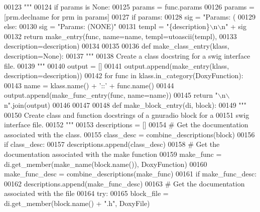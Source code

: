 \begin{DoxyCode}
{00123 \textcolor{stringliteral}{    """}
00124     \textcolor{keywordflow}{if} params \textcolor{keywordflow}{is} \textcolor{keywordtype}{None}:
00125         params = func.params
00126     params = [prm.declname \textcolor{keywordflow}{for} prm \textcolor{keywordflow}{in} params]
00127     \textcolor{keywordflow}{if} params:
00128         sig = \textcolor{stringliteral}{"Params: (%
00129     \textcolor{keywordflow}{else}:
00130         sig = \textcolor{stringliteral}{"Params: (NONE)"}
00131     templ = \textcolor{stringliteral}{"\{description\}\(\backslash\)n\(\backslash\)n"} + sig
00132     \textcolor{keywordflow}{return} make_entry(func, name=name, templ=utoascii(templ),
00133                       description=description)
00134 
00135 
00136 \textcolor{keyword}{def }make_class_entry(klass, description=None):
00137     \textcolor{stringliteral}{"""}
00138 \textcolor{stringliteral}{    Create a class docstring for a swig interface file.}
00139 \textcolor{stringliteral}{    """}
00140     output = []
00141     output.append(make_entry(klass, description=description))
00142     \textcolor{keywordflow}{for} func \textcolor{keywordflow}{in} klass.in\_category(DoxyFunction):
00143         name = klass.name() + \textcolor{stringliteral}{'::'} + func.name()
00144         output.append(make_func_entry(func, name=name))
00145     \textcolor{keywordflow}{return} \textcolor{stringliteral}{"\(\backslash\)n\(\backslash\)n"}.join(output)
00146 
00147 
00148 \textcolor{keyword}{def }make_block_entry(di, block):
00149     \textcolor{stringliteral}{"""}
00150 \textcolor{stringliteral}{    Create class and function docstrings of a gnuradio block for a}
00151 \textcolor{stringliteral}{    swig interface file.}
00152 \textcolor{stringliteral}{    """}
00153     descriptions = []
00154     \textcolor{comment}{# Get the documentation associated with the class.}
00155     class\_desc = combine_descriptions(block)
00156     \textcolor{keywordflow}{if} class\_desc:
00157         descriptions.append(class\_desc)
00158     \textcolor{comment}{# Get the documentation associated with the make function}
00159     make\_func = di.get\_member(make_name(block.name()), DoxyFunction)
00160     make\_func\_desc = combine_descriptions(make\_func)
00161     \textcolor{keywordflow}{if} make\_func\_desc:
00162         descriptions.append(make\_func\_desc)
00163     \textcolor{comment}{# Get the documentation associated with the file}
00164     \textcolor{keywordflow}{try}:
00165         block\_file = di.get\_member(block.name() + \textcolor{stringliteral}{".h"}, DoxyFile)
}}
\end{DoxyCode}
